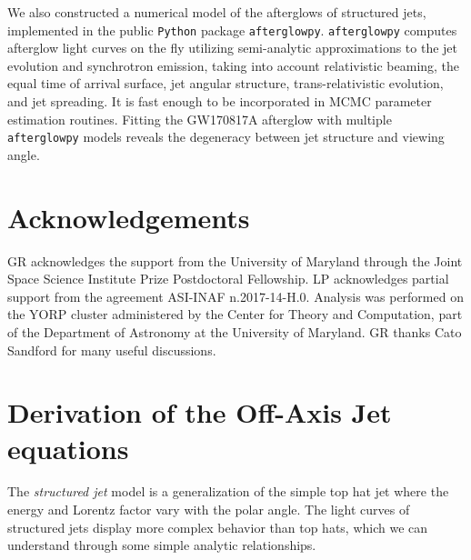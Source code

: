 \documentclass[twocolumn]{aastex62}
\newcommand{\gwbns}{GW170817A}
\newcommand{\afterglowpy}{{\tt afterglowpy}}
\newcommand{\python}{{\tt Python}}
\begin{document}
We also constructed a numerical model of the afterglows of structured jets, implemented in the public \python{} package \afterglowpy{}. \afterglowpy{} computes afterglow light curves on the fly utilizing semi-analytic approximations to the jet evolution and synchrotron emission, taking into account relativistic beaming, the equal time of arrival surface, jet angular structure, trans-relativistic evolution, and jet spreading.  It is fast enough to be incorporated in MCMC parameter estimation routines.  Fitting the \gwbns{} afterglow with multiple \afterglowpy{} models reveals the degeneracy between jet structure and viewing angle.

\section{Acknowledgements} \label{sec:acknowledgements}

GR acknowledges the support from the University of Maryland through the Joint Space Science Institute Prize Postdoctoral Fellowship. LP acknowledges partial support from the agreement ASI-INAF n.2017-14-H.0. Analysis was performed on the YORP cluster administered by the Center for Theory and Computation, part of the Department of Astronomy at the University of Maryland.  GR thanks Cato Sandford for many useful discussions.



\appendix
\section{Derivation of the Off-Axis Jet equations}\label{app:derive1}

  The \emph{structured jet} model is a generalization of the simple top hat jet where the energy and Lorentz factor vary with the polar angle.  The light curves of structured jets display more complex behavior than top hats, which we can understand through some simple analytic relationships.
  
\end{document}

